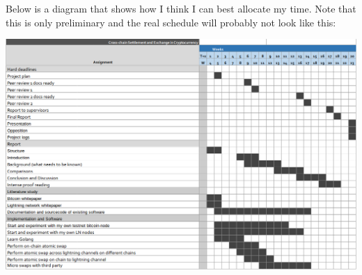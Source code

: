 Below is a diagram that shows how I think I can best allocate my time. Note that this is only preliminary and the real schedule will probably not look like this:

\centerline{\includegraphics[scale=0.53]{timeplan2.png}}
